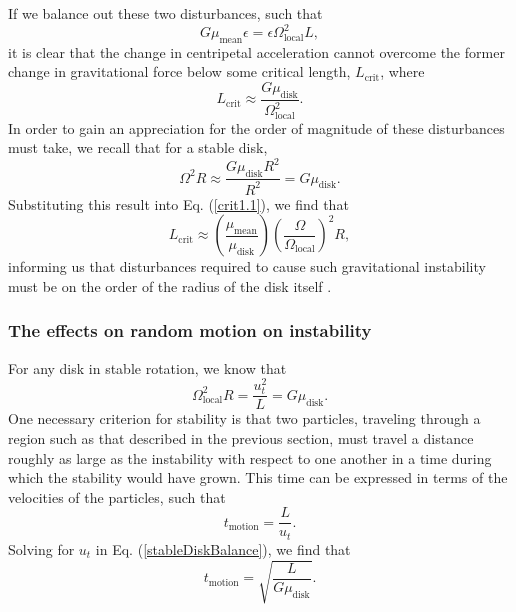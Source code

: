 \documentclass[aps,pra,twocolumn]{revtex4-1}
\begin{document}
If we balance out these two disturbances, such that
\begin{equation}
G \mu_\text{mean} \epsilon = \epsilon \Omega_\text{local}^2 L ,
\end{equation}
it is clear that the change in centripetal acceleration cannot overcome the former change in gravitational force below some critical length, $L_\text{crit}$, where
\begin{equation}
L_\text{crit} \approx \frac{G \mu_\text{disk}}{\Omega_\text{local}^2}. \label{crit1.1}
\end{equation}
In order to gain an appreciation for the order of magnitude of these disturbances must take, we recall that for a stable disk,
\begin{equation}
\Omega^2 R \approx \frac{G\mu_\text{disk} R^2}{R^2} = G\mu_\text{disk}.
\end{equation}
Substituting this result into Eq. (\ref{crit1.1}), we find that
\begin{equation}
L_\text{crit} \approx \left(\frac{\mu_\text{mean}}{\mu_\text{disk}}\right)\left(\frac{\Omega}{\Omega_\text{local}}\right)^2 R,
\end{equation}
informing us that disturbances required to cause such gravitational instability must be on the order of the radius of the disk itself \cite{toomre1964}.

\subsubsection{\label{section 3.1.2} The effects on random motion on instability}
For any disk in stable rotation, we know that
\begin{equation}
\Omega_\text{local}^2 R = \frac{u_t^2}{L} = G \mu_\text{disk}. \label{stableDiskBalance}
\end{equation}
One necessary criterion for stability is that two particles, traveling through a region such as that described in the previous section, must travel a distance roughly as large as the instability with respect to one another in a time during which the stability would have grown.  This time can be expressed in terms of the velocities of the particles, such that 
\begin{equation}
t_\text{motion} = \frac{L}{u_t}.
\end{equation}
Solving for $u_t$ in Eq. (\ref{stableDiskBalance}), we find that
\begin{equation}
t_\text{motion} = \sqrt{\frac{L}{G\mu_\text{disk}}}.
\end{equation}
\end{document}
